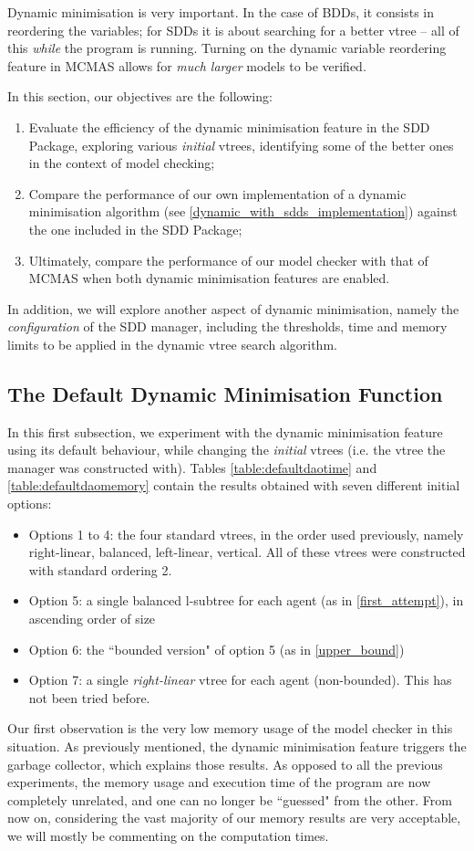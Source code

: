 \documentclass[11pt]{report}
\begin{document}
Dynamic minimisation is very important. In the case of BDDs, it consists in reordering the variables; for SDDs it is about searching for a better vtree -- all of this \textit{while} the program is running. Turning on the dynamic variable reordering feature in MCMAS allows for \textit{much larger} models to be verified.

In this section, our objectives are the following:
\begin{enumerate}
\item Evaluate the efficiency of the dynamic minimisation feature in the  SDD Package, exploring various \textit{initial} vtrees, identifying some of the better ones in the context of model checking; 
\item Compare the performance of our own implementation of a dynamic minimisation algorithm (see \ref{dynamic_with_sdds_implementation}) against the one included in the SDD Package;
\item Ultimately, compare the performance of our model checker with that of MCMAS when both dynamic minimisation features are enabled.
\end{enumerate}
In addition, we will explore another aspect of dynamic minimisation, namely the \textit{configuration} of the SDD manager, including the thresholds, time and memory limits to be applied in the dynamic vtree search algorithm. 

\subsection{The Default Dynamic Minimisation Function}

In this first subsection, we experiment with the dynamic minimisation feature using its default behaviour, while changing the \textit{initial }vtrees (i.e. the vtree the manager was constructed with). Tables \ref{table:defaultdaotime} and \ref{table:defaultdaomemory} contain the results obtained with seven different initial options: \begin{itemize}
\item Options 1 to 4: the four standard vtrees, in the order used previously, namely right-linear, balanced, left-linear, vertical. All of these vtrees were constructed with standard ordering 2.
\item Option 5: a single balanced l-subtree for each agent (as in \ref{first_attempt}), in ascending order of size
\item Option 6: the ``bounded version" of option 5 (as in \ref{upper_bound})
\item Option 7: a single \textit{right-linear} vtree for each agent (non-bounded). This has not been tried before.
\end{itemize}
Our first observation is the very low memory usage of the model checker in this situation. As previously mentioned, the dynamic minimisation feature triggers the garbage collector, which explains those results. As opposed to all the previous experiments, the memory usage and execution time of the program are now completely unrelated, and one can no longer be ``guessed" from the other. From now on, considering the vast majority of our memory results are very acceptable, we will mostly be commenting on the computation times.
\end{document}
